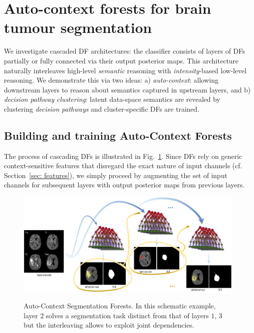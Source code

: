 
\section{Auto-context forests for brain tumour segmentation}
\label{sec: cascading}

We investigate cascaded DF architectures: the classifier consists of layers of DFs partially or fully connected via their output posterior maps. 
This architecture naturally interleaves high-level \textit{semantic} reasoning with \textit{intensity}-based low-level 
reasoning. We demonstrate this via two ideas: a) \textit{auto-context}: allowing downstream layers to reason about 
semantics captured in upstream layers, and b) \textit{decision pathway clustering}: latent data-space semantics are 
revealed by clustering \textit{decision pathways} and cluster-specific DFs are trained. 

\subsection{Building and training Auto-Context Forests}

The process of cascading DFs is illustrated in Fig.~\ref{fig: DN concept}. Since DFs rely on generic context-sensitive features %
that disregard the exact nature of input channels (cf. Section~\ref{sec: features}), we simply proceed by augmenting the set of input channels for subsequent layers with output posterior maps from previous layers. %

\begin{figure}
\centering
\includegraphics[width=1\columnwidth]{images/DecisionNetwork-BRATS.png}
\label{fig: DN concept}
\caption{Auto-Context Segmentation Forests. In this schematic example, layer $2$ solves a segmentation task distinct from that of layers $1$, $3$ but the interleaving allows to exploit joint dependencies.}
\end{figure}

